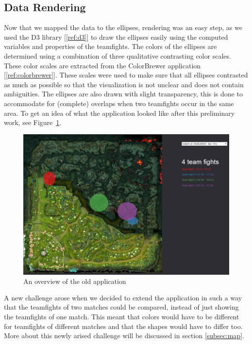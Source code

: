 \documentclass[11pt,twoside,a4paper]{article}
\begin{document}
\subsection{Data Rendering}
\label{subsec:datarendering}
Now that we mapped the data to the ellipses, rendering was an easy step, as we used the D3 library [\ref{ref:d3}]
 to draw the ellipses easily using the computed variables and properties of the teamfights. The colors of the ellipses are determined using a combination of three qualitative contrasting color scales. These color scales are extracted from the ColorBrewer application [\ref{ref:colorbrewer}].
These scales were used to make sure that all ellipses contrasted as much as possible so that the visualization is not unclear and does not contain ambiguities. 
The ellipses are also drawn with slight transparency, this is done to accommodate for (complete) overlaps when two teamfights occur in the same area.
\newline\newline
To get an idea of what the application looked like after this preliminary work, see Figure~\ref{fig:oldapp}.

\begin{figure}[ht]
\centering
\includegraphics[width=\textwidth]{oldApp.png}
\caption{An overview of the old application}
\label{fig:oldapp}
\end{figure}

A new challenge arose when we decided to extend the application in such a way that the teamfights of two matches could be compared, instead of just showing the teamfights of one match. This meant that colors would have to be different for teamfights of different matches and that the shapes would have to differ too. More about this newly arised challenge will be discussed in section \ref{subsec:map}.
\end{document}
